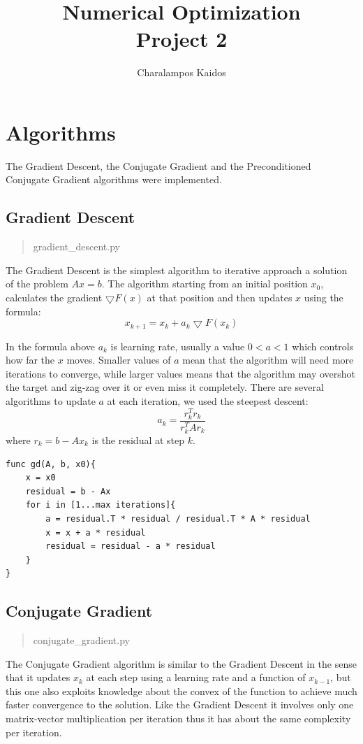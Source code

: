 \documentclass[a4paper]{article}
\begin{document}
\title{Numerical Optimization\\Project 2}
\author{Charalampos Kaidos}

\maketitle

\section{Algorithms}
The Gradient Descent, the Conjugate Gradient and the Preconditioned Conjugate Gradient algorithms were implemented.

\subsection{Gradient Descent}
\begin{quote}
	gradient\_descent.py
\end{quote}
The Gradient Descent is the simplest algorithm to iterative approach a solution of the problem $Ax=b$. The algorithm starting from an initial position $x_0$, calculates the gradient $\bigtriangledown F(x)$ at that position and then updates $x$ using the formula:
$$
x_{k+1}=x_k + a_k\bigtriangledown F(x_k)
$$

In the formula above $a_k$ is learning rate, usually a value $0<a<1$ which controls how far the $x$ moves. Smaller values of $a$ mean that the algorithm will need more iterations to converge, while larger values means that the algorithm may overshot the target and zig-zag over it or even miss it completely. There are several algorithms to update $a$ at each iteration, we used the steepest descent:
$$
a_k = \frac{r_k^Tr_k}{r_k^TAr_k}
$$
where $r_k = b - Ax_k$ is the residual at step $k$.

\begin{lstlisting}
func gd(A, b, x0){
	x = x0
	residual = b - Ax
	for i in [1...max iterations]{
		a = residual.T * residual / residual.T * A * residual
		x = x + a * residual
		residual = residual - a * residual
	}
}
\end{lstlisting}

\subsection{Conjugate Gradient}
\begin{quote}
	conjugate\_gradient.py
\end{quote}
The Conjugate Gradient algorithm is similar to the Gradient Descent in the sense that it updates $x_k$ at each step using a learning rate and a function of $x_{k-1}$, but this one also exploits knowledge about the convex of the function to achieve much faster convergence to the solution. Like the Gradient Descent it involves only one matrix-vector multiplication per iteration thus it has about the same complexity per iteration.
\end{document}
